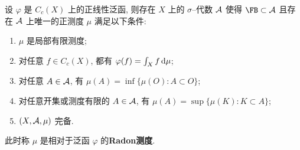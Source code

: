 	\begin{Proposition}[Riesz]
		设 $ \varphi $ 是 $ C_c(X) $ 上的正线性泛函, 则存在 $ X $ 上的 $ \sigma $--代数 $ \mathcal{A} $ 使得 $ \FB\subset\CA $ 且存在 $ \mathcal{A} $ 上唯一的正测度 $ \mu $ 满足以下条件:
		\begin{enumerate}[(1)]
			\item $ \mu $ 是局部有限测度;
			\item 对任意 $ f\in C_c(X) $, 都有 $ \varphi(f)=\int_Xf\,\mathrm{d}\mu $;
			\item 对任意 $ A\in\mathcal{A} $, 有 $ \mu(A)=\inf\{\mu(O) : A\subset O\} $;
			\item 对任意开集或测度有限的 $ A\in\mathcal{A} $, 有 $ \mu(A)=\sup\{\mu(K) : K\subset A\} $;
			\item $ (X,\mathcal{A},\mu) $ 完备.
		\end{enumerate}
		此时称 $ \mu $ 是相对于泛函 $ \varphi $ 的\textbf{Radon测度}.
	\end{Proposition}
